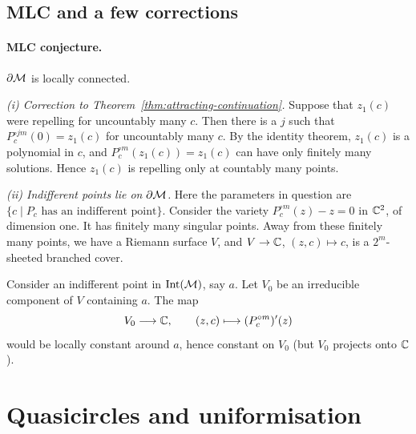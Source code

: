 \documentclass[11pt,a4paper]{article}
\begin{document}
\subsection{MLC and a few corrections}
\paragraph{MLC conjecture.} $\partial\mathcal M$ is locally connected.

\textit{(i) Correction to Theorem~\ref{thm:attracting-continuation}.}
Suppose that $z_1(c)$ were repelling for uncountably many $c$. Then there is a $j$ such that $P_c^{\circ jm}(0)=z_1(c)$ for uncountably many $c$. By the identity theorem, $z_1(c)$ is a polynomial in $c$, and $P_c^{\circ m}(z_1(c))=z_1(c)$ can have only finitely many solutions. Hence $z_1(c)$ is repelling only at countably many points.

\textit{(ii) Indifferent points lie on $\partial\mathcal M$.}
Here the parameters in question are $\{c\mid P_c\text{ has an indifferent point}\}$. Consider the variety $P_c^{\circ m}(z)-z=0$ in $\mathbb{C}^2$, of dimension one. It has finitely many singular points. Away from these finitely many points, we have a Riemann surface $V$, and $V\to\mathbb{C}$, $(z,c)\mapsto c$, is a $2^m$-sheeted branched cover.

Consider an indifferent point in $\operatorname{Int}(\mathcal M)$, say $a$. Let $V_0$ be an irreducible component of $V$ containing $a$. The map
\[
V_0\longrightarrow\mathbb{C},
\qquad (z,c)\longmapsto(P_c^{\circ m})'(z)
\]
would be locally constant around $a$, hence constant on $V_0$ (but $V_0$ projects onto $\mathbb{C}$).


\section{Quasicircles and uniformisation}
\end{document}
